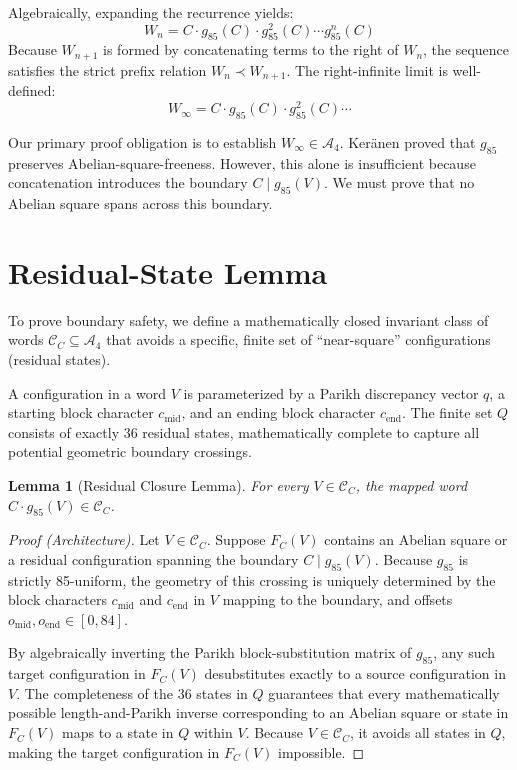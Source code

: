 \documentclass[12pt]{article}
\newtheorem{lemma}{Lemma}
\begin{document}
Algebraically, expanding the recurrence yields:
$$W_n = C \cdot g_{85}(C) \cdot g_{85}^2(C) \cdots g_{85}^n(C)$$
Because $W_{n+1}$ is formed by concatenating terms to the right of $W_n$, the sequence satisfies the strict prefix relation $W_n \prec W_{n+1}$. The right-infinite limit is well-defined:
$$W_\infty = C \cdot g_{85}(C) \cdot g_{85}^2(C) \cdots$$

Our primary proof obligation is to establish $W_\infty \in \mathcal{A}_4$. Ker\"anen proved that $g_{85}$ preserves Abelian-square-freeness. However, this alone is insufficient because concatenation introduces the boundary $C \mid g_{85}(V)$. We must prove that no Abelian square spans across this boundary.


\section{Residual-State Lemma}
To prove boundary safety, we define a mathematically closed invariant class of words $\mathcal{C}_C \subseteq \mathcal{A}_4$ that avoids a specific, finite set of ``near-square'' configurations (residual states).

A configuration in a word $V$ is parameterized by a Parikh discrepancy vector $q$, a starting block character $c_{\mathrm{mid}}$, and an ending block character $c_{\mathrm{end}}$. The finite set $Q$ consists of exactly 36 residual states, mathematically complete to capture all potential geometric boundary crossings. 

\begin{lemma}[Residual Closure Lemma]
For every $V \in \mathcal{C}_C$, the mapped word $C \cdot g_{85}(V) \in \mathcal{C}_C$.
\end{lemma}
\begin{proof}[Proof (Architecture)]
Let $V \in \mathcal{C}_C$. Suppose $F_C(V)$ contains an Abelian square or a residual configuration spanning the boundary $C \mid g_{85}(V)$. Because $g_{85}$ is strictly 85-uniform, the geometry of this crossing is uniquely determined by the block characters $c_{\mathrm{mid}}$ and $c_{\mathrm{end}}$ in $V$ mapping to the boundary, and offsets $o_{\mathrm{mid}}, o_{\mathrm{end}} \in [0, 84]$. 

By algebraically inverting the Parikh block-substitution matrix of $g_{85}$, any such target configuration in $F_C(V)$ desubstitutes exactly to a source configuration in $V$. The completeness of the 36 states in $Q$ guarantees that every mathematically possible length-and-Parikh inverse corresponding to an Abelian square or state in $F_C(V)$ maps to a state in $Q$ within $V$. Because $V \in \mathcal{C}_C$, it avoids all states in $Q$, making the target configuration in $F_C(V)$ impossible.
\end{proof}
\end{document}
